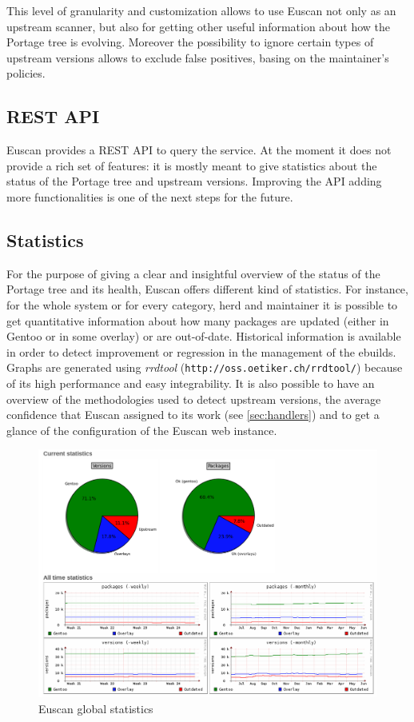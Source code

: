 This level of granularity and customization allows to use Euscan not only as an upstream scanner, but also for getting other useful information about how the Portage tree is evolving. Moreover the possibility to ignore certain types of upstream versions allows to exclude false positives, basing on the maintainer's policies.


\subsection{REST API}
Euscan provides a REST API to query the service. At the moment it does not provide a rich set of features: it is mostly meant to give statistics about the status of the Portage tree and upstream versions.
Improving the API adding more functionalities is one of the next steps for the future.


\subsection{Statistics}
For the purpose of giving a clear and insightful overview of the status of the Portage tree and its health, Euscan offers different kind of statistics.
For instance, for the whole system or for every category, herd and maintainer it is possible to get quantitative information about how many packages are updated (either in Gentoo or in some overlay) or are out-of-date. Historical information is available in order to detect improvement or regression in the management of the ebuilds.
Graphs are generated using \emph{rrdtool} (\texttt{http://oss.oetiker.ch/rrdtool/}) because of its high performance and easy integrability.
It is also possible to have an overview of the methodologies used to detect upstream versions, the average confidence that Euscan assigned to its work (see \ref{sec:handlers}) and to get a glance of the configuration of the Euscan web instance.

\begin{figure}[h!]
  \centering
    \includegraphics[width=13.5cm,natwidth=1030,natheight=754]{img/statistics.png}
  \caption{Euscan global statistics}
\end{figure}


